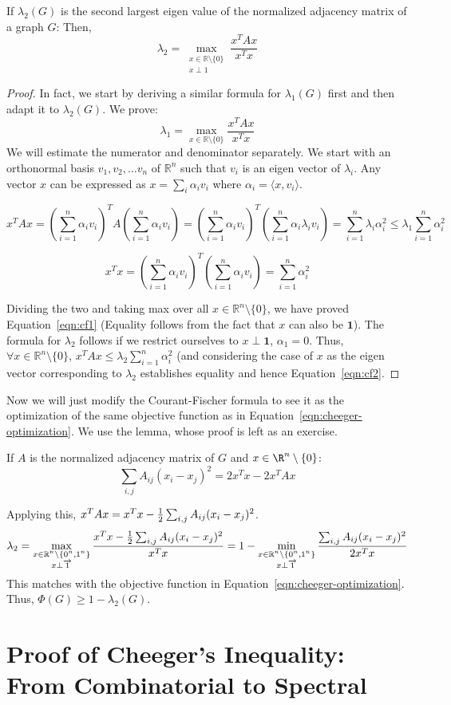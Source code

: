 \begin{lemma}
If $\lambda_2(G)$ is the second largest eigen value of the normalized adjacency matrix of a graph $G$: Then,
\begin{equation}
\lambda_2 = \max_{\substack{x \in \mathbb{R}\setminus\{0\}\\x\perp 1}} \frac{x^TAx}{x^Tx}
\label{eqn:cf2}
\end{equation}
\end{lemma}
\begin{proof}
In fact, we start by deriving a similar formula for $\lambda_1(G)$ first and then adapt it to $\lambda_2(G)$. We prove:
\begin{equation}
\lambda_1 = \max_{x \in \mathbb{R}\setminus\{0\}} \frac{x^TAx}{x^Tx}
\label{eqn:cf1}
\end{equation}
We will estimate the numerator and denominator separately. We start with an orthonormal basis $v_1, v_2, \ldots v_n$ of $\mathbb{R}^n$ such that $v_i$ is an eigen vector of $\lambda_i$. Any vector $x$ can be expressed as $x = \sum_i \alpha_i v_i$ where $\alpha_i = \langle x,v_i \rangle$.

$$ x^TAx = \left(\sum_{i=1}^n \alpha_iv_i\right)^T A \left(\sum_{i=1}^n \alpha_i v_i \right) = \left(\sum_{i=1}^n \alpha_iv_i\right)^T \left(\sum_{i=1}^n \alpha_i \lambda_iv_i \right) = \sum_{i=1}^n \lambda_i \alpha_i^2  \le \lambda_1 \sum_{i=1}^n  \alpha_i^2 $$

$$ x^Tx = \left(\sum_{i=1}^n \alpha_iv_i\right)^T \left(\sum_{i=1}^n \alpha_i v_i \right) = \sum_{i=1}^n \alpha_i^2$$

Dividing the two and taking max over all $x \in \mathbb{R}^n\setminus\{0\}$, we have proved Equation~\ref{eqn:cf1} (Equality follows from the fact that $x$ can also be $\textbf{1}$). The formula for $\lambda_2$ follows if we restrict ourselves to $x \perp \textbf{1}$, $\alpha_1 = 0$. Thus, $\forall x \in \mathbb{R}^n \setminus \{0\}$, $x^TAx \le \lambda_2 \sum_{i=1}^n  \alpha_i^2$ (and considering the case of $x$ as the eigen vector corresponding to $\lambda_2$ establishes equality and hence Equation~\ref{eqn:cf2}.
\end{proof}

Now we will just modify the Courant-Fischer formula to see it as the optimization of the same objective function as in Equation~\ref{eqn:cheeger-optimization}. We use the lemma, whose proof is left as an exercise.
\begin{exercise}
If $A$ is the normalized adjacency matrix of $G$ and $x \in \R^n\setminus\{0\}$:
$$\sum_{i,j} A_{ij}(x_i-x_j)^2 = 2x^Tx - 2x^TAx$$
\end{exercise}
Applying this, $x^TAx = x^Tx - \frac{1}{2} \sum_{i,j} A_{ij}(x_i-x_j)^2$.
$$\lambda_2 = \max_{\substack{
x \in \mathbb{R}^n\setminus \{0^n,1^n\}\\
x \perp \mathbf{\overrightarrow{1}}}}
\frac{x^Tx - \frac{1}{2}\sum_{i,j}A_{ij}(x_i-x_j)^2}{x^Tx} = 1-\min_{\substack{
x \in \mathbb{R}^n\setminus \{0^n,1^n\}\\
x \perp \mathbf{\overrightarrow{1}}}}
\frac{\sum_{i,j}A_{ij}(x_i-x_j)^2}{2x^Tx}$$
This matches with the objective function in Equation~\ref{eqn:cheeger-optimization}. Thus, $\Phi(G) \ge 1-\lambda_2(G)$.

\section{Proof of Cheeger's Inequality: From Combinatorial to Spectral}


